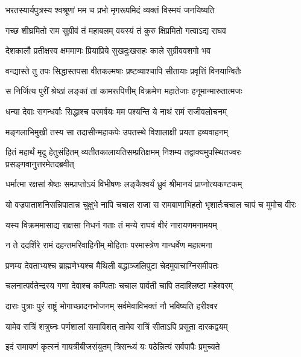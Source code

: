 \twolineshloka
{भरतस्यार्यपुत्रस्य श्वश्रूणां मम च प्रभो}
{मृगरूपमिदं व्यक्तं विस्मयं जनयिष्यति}%

\twolineshloka
{गच्छ शीघ्रमितो राम सुग्रीवं तं महाबलम्}
{वयस्यं तं कुरु क्षिप्रमितो गत्वाऽद्य राघव}%

\twolineshloka
{देशकालौ प्रतीक्षस्व क्षममाणः प्रियाप्रिये}
{सुखदुःखसहः काले  सुग्रीववशगो भव}%

\twolineshloka
{वन्द्यास्ते तु तपः सिद्धास्तपसा वीतकल्मषाः}
{प्रष्टव्याश्चापि सीतायाः प्रवृत्तिं विनयान्वितैः}%

\twolineshloka
{स निर्जित्य पुरीं श्रेष्ठां लङ्कां तां कामरूपिणीम्}
{विक्रमेण महातेजाः हनूमान्मारुतात्मजः}%

\twolineshloka
{धन्या देवाः सगन्धर्वाः सिद्धाश्च परमर्षयः}
{मम पश्यन्ति ये नाथं रामं राजीवलोचनम्}%

\twolineshloka
{मङ्गलाभिमुखी तस्य सा तदासीन्महाकपेः}
{उपतस्थे विशालाक्षी प्रयता हव्यवाहनम्}%

\fourlineindentedshloka
{हितं महार्थं मृदु हेतुसंहितम्}
{व्यतीतकालायतिसम्प्रतिक्षमम्}
{निशम्य तद्वाक्यमुपस्थितज्वरः}
{प्रसङ्गवानुत्तरमेतदब्रवीत्}%

\twolineshloka
{धर्मात्मा रक्षसां श्रेष्ठः सम्प्राप्तोऽयं विभीषणः}
{लङ्कैश्वर्यं ध्रुवं श्रीमानयं प्राप्नोत्यकण्टकम्}%

\fourlineindentedshloka
{यो वज्रपाताशनिसन्निपातान्}{न चुक्षुभे नापि चचाल राजा}
{स रामबाणाभिहतो भृशार्तः}{चचाल चापं च मुमोच वीरः}%

\twolineshloka
{यस्य विक्रममासाद्य राक्षसा निधनं गताः}
{तं मन्ये राघवं वीरं नारायणमनामयम्}%

\twolineshloka
{न ते ददर्शिरे रामं दहन्तमरिवाहिनीम्}
{मोहिताः परमास्त्रेण गान्धर्वेण महात्मना}%

\twolineshloka
{प्रणम्य देवताभ्यश्च ब्राह्मणेभ्यश्च मैथिली}
{बद्धाञ्जलिपुटा चेदमुवाचाग्निसमीपतः}%

\twolineshloka
{चलनात्पर्वतेन्द्रस्य गणा देवाश्च कम्पिताः}
{चचाल पार्वती चापि तदाश्लिष्टा महेश्वरम्} %

\twolineshloka
{दाराः पुत्राः पुरं राष्ट्रं भोगाच्छादनभोजनम्}
{सर्वमेवाविभक्तं नौ भविष्यति हरीश्वर}%

\twolineshloka
{यामेव रात्रिं शत्रुघ्नः पर्णशालां समाविशत्}
{तामेव रात्रिं सीताऽपि प्रसूता दारकद्वयम्}%

\twolineshloka
{इदं रामायणं कृत्स्नं गायत्रीबीजसंयुतम्}
{त्रिसन्ध्यं यः पठेन्नित्यं सर्वपापैः प्रमुच्यते}

